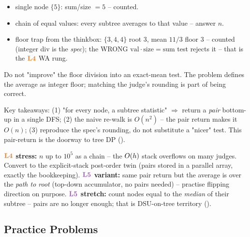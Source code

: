 \begin{itemize}[nosep]
  \item single node $\{5\}$: sum/size $=5$ -- counted. \hfill{}
  \item chain of equal values: every subtree averages to that value -- answer $n$.
  \item floor trap from the thinkbox: $\{3,4,4\}$ root 3, mean $11/3$ floor $3$ -- counted
        (integer div is the \emph{spec}); the WRONG $\mathrm{val}\cdot\mathrm{size}=\mathrm{sum}$
        test rejects it -- that is the $\lv4$ WA rung.
\end{itemize}

\begin{warningbox}
Do not "improve" the floor division into an exact-mean test. The problem defines the
average as integer floor; matching the judge's rounding is part of being correct.
\end{warningbox}

\begin{insightbox}
Key takeaways: (1) "for every node, a subtree statistic" $\Rightarrow$ return a
\emph{pair} bottom-up in a single DFS; (2) the naive re-walk is $O(n^2)$ -- the pair
return makes it $O(n)$; (3) reproduce the spec's rounding, do not substitute a "nicer"
test. This pair-return is the doorway to tree DP ().
\end{insightbox}

\begin{hardeningbox}
\textbf{$\lv4$ stress:} $n$ up to $10^5$ as a chain -- the $O(h)$ stack overflows on
many judges. Convert to the explicit-stack post-order twin (pairs stored in a parallel
array, exactly the  bookkeeping). \textbf{$\lv5$ variant:} same pair
return but the average is over the \emph{path to root} (top-down accumulator, no pairs
needed) -- practise flipping direction on purpose. \textbf{$\lv5$ stretch:} count nodes
equal to the \emph{median} of their subtree -- pairs are no longer enough; that is
DSU-on-tree territory ().
\end{hardeningbox}

\subsection{Practice Problems}

